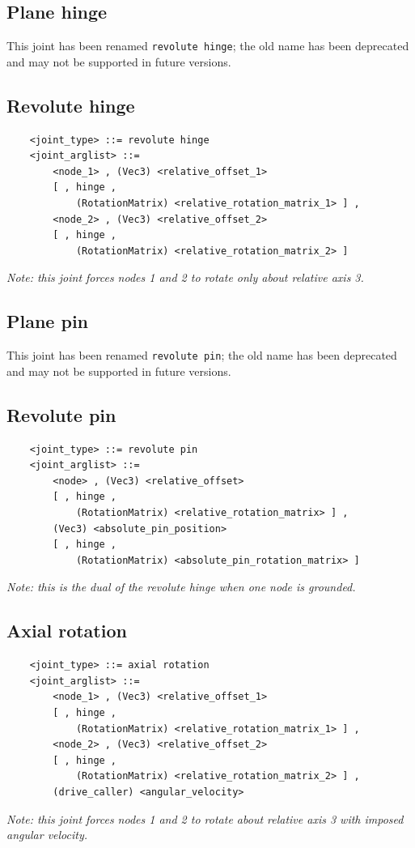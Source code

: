 \subsection{Plane hinge}
This joint has been renamed \texttt{revolute hinge}; the old name has been
deprecated and may not be supported in future versions.

\subsection{Revolute hinge}
\begin{verbatim}
    <joint_type> ::= revolute hinge
    <joint_arglist> ::= 
        <node_1> , (Vec3) <relative_offset_1> 
        [ , hinge , 
            (RotationMatrix) <relative_rotation_matrix_1> ] ,
        <node_2> , (Vec3) <relative_offset_2>
        [ , hinge , 
            (RotationMatrix) <relative_rotation_matrix_2> ]
\end{verbatim}
{\em
    Note: this joint forces nodes 1 and 2 to rotate only about relative 
    axis 3.
}

\subsection{Plane pin}
This joint has been renamed \texttt{revolute pin}; the old name has been
deprecated and may not be supported in future versions.

\subsection{Revolute pin}
\begin{verbatim}
    <joint_type> ::= revolute pin
    <joint_arglist> ::= 
        <node> , (Vec3) <relative_offset>
        [ , hinge , 
            (RotationMatrix) <relative_rotation_matrix> ] ,
        (Vec3) <absolute_pin_position>
        [ , hinge , 
            (RotationMatrix) <absolute_pin_rotation_matrix> ]
\end{verbatim}
{\em
    Note: this is the dual of the revolute hinge when one node is grounded.
}

\subsection{Axial rotation}
\begin{verbatim}
    <joint_type> ::= axial rotation
    <joint_arglist> ::= 
        <node_1> , (Vec3) <relative_offset_1> 
        [ , hinge , 
            (RotationMatrix) <relative_rotation_matrix_1> ] ,
        <node_2> , (Vec3) <relative_offset_2>
        [ , hinge , 
            (RotationMatrix) <relative_rotation_matrix_2> ] ,
        (drive_caller) <angular_velocity>
\end{verbatim}
{\em
    Note: this joint forces nodes 1 and 2 to rotate about relative 
    axis 3 with imposed angular velocity.
}

